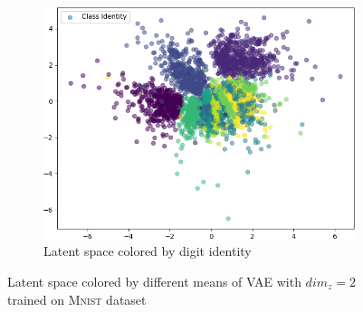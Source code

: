 \begin{figure}
    \hfill
    \begin{subfigure}{.24\textwidth}
        \includegraphics[width=\textwidth]{images/latent_spaces/mnist/vae/embeddings_mu_6.png}
        \caption{Latent space colored by digit identity}
        \label{subfig:vae_mnist_latent_space_identity}
    \end{subfigure}
    \caption[\ac{VAE} Latent Space on \textsc{Mnist}]{Latent space colored by different means of \ac{VAE} with $dim_z=2$ trained on \textsc{Mnist} dataset}
    \label{fig:vae_latent_space_mnist}
\end{figure}

